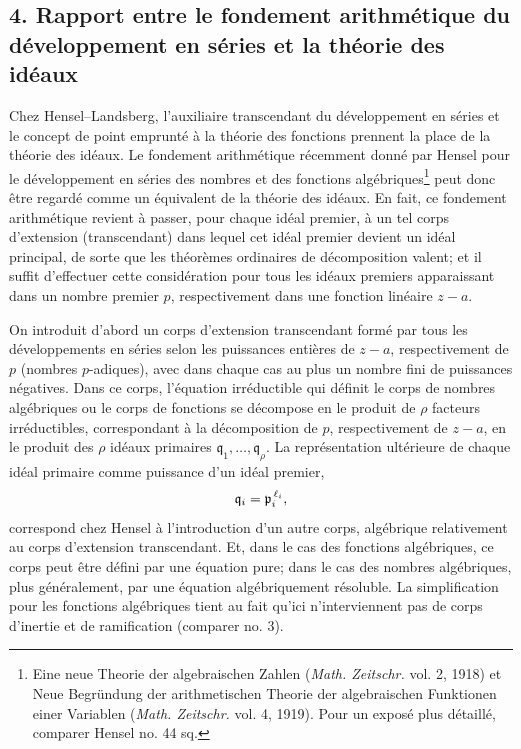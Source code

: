 \subsection*{4. Rapport entre le fondement arithmétique du développement en séries et la théorie des idéaux}

Chez Hensel--Landsberg, l'auxiliaire transcendant du développement en séries et le concept de point emprunté à la théorie des fonctions prennent la place de la théorie des idéaux. Le fondement arithmétique récemment donné par Hensel pour le développement en séries des nombres et des fonctions algébriques\footnote{Eine neue Theorie der algebraischen Zahlen (\emph{Math. Zeitschr.} vol. 2, 1918) et Neue Begründung der arithmetischen Theorie der algebraischen Funktionen einer Variablen (\emph{Math. Zeitschr.} vol. 4, 1919). Pour un exposé plus détaillé, comparer Hensel no. 44 sq.} peut donc être regardé comme un équivalent de la théorie des idéaux. En fait, ce fondement arithmétique revient à passer, pour chaque idéal premier, à un tel corps d'extension (transcendant) dans lequel cet idéal premier devient un idéal principal, de sorte que les théorèmes ordinaires de décomposition valent; et il suffit d'effectuer cette considération pour tous les idéaux premiers apparaissant dans un nombre premier \(p\), respectivement dans une fonction linéaire \(z-a\).

On introduit d'abord un corps d'extension transcendant formé par tous les développements en séries selon les puissances entières de \(z-a\), respectivement de \(p\) (nombres \(p\)-adiques), avec dans chaque cas au plus un nombre fini de puissances négatives. Dans ce corps, l'équation irréductible qui définit le corps de nombres algébriques ou le corps de fonctions se décompose en le produit de \(\rho\) facteurs irréductibles, correspondant à la décomposition de \(p\), respectivement de \(z-a\), en le produit des \(\rho\) idéaux \og{}primaires\fg{} \(\mathfrak q_1,\ldots,\mathfrak q_\rho\). La représentation ultérieure de chaque idéal primaire comme puissance d'un idéal premier,
\[
\mathfrak q_i=\mathfrak p_i^{\,\ell_i},
\]
correspond chez Hensel à l'introduction d'un autre corps, algébrique relativement au corps d'extension transcendant. Et, dans le cas des fonctions algébriques, ce corps peut être défini par une équation pure; dans le cas des nombres algébriques, plus généralement, par une équation algébriquement résoluble. La simplification pour les fonctions algébriques tient au fait qu'ici n'interviennent pas de corps d'inertie et de ramification (comparer no. 3).

